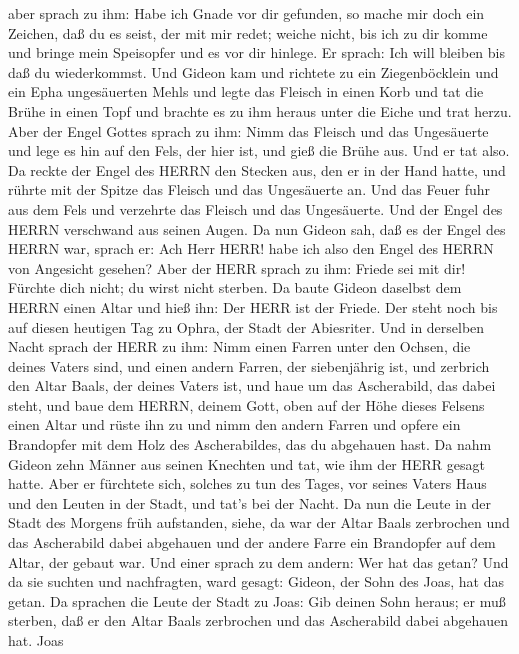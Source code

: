 aber sprach zu ihm: Habe ich Gnade vor dir gefunden, so mache mir doch
ein Zeichen, daß du es seist, der mit mir redet;  weiche
nicht, bis ich zu dir komme und bringe mein Speisopfer und es vor dir
hinlege. Er sprach: Ich will bleiben bis daß du wiederkommst.
 Und Gideon kam und richtete zu ein Ziegenböcklein und ein
Epha ungesäuerten Mehls und legte das Fleisch in einen Korb und tat die
Brühe in einen Topf und brachte es zu ihm heraus unter die Eiche und
trat herzu.  Aber der Engel Gottes sprach zu ihm: Nimm das
Fleisch und das Ungesäuerte und lege es hin auf den Fels, der hier ist,
und gieß die Brühe aus. Und er tat also.  Da reckte der
Engel des HERRN den Stecken aus, den er in der Hand hatte, und rührte
mit der Spitze das Fleisch und das Ungesäuerte an. Und das Feuer fuhr
aus dem Fels und verzehrte das Fleisch und das Ungesäuerte. Und der
Engel des HERRN verschwand aus seinen Augen.  Da nun Gideon
sah, daß es der Engel des HERRN war, sprach er: Ach Herr HERR! habe ich
also den Engel des HERRN von Angesicht gesehen?  Aber der
HERR sprach zu ihm: Friede sei mit dir! Fürchte dich nicht; du wirst
nicht sterben.  Da baute Gideon daselbst dem HERRN einen
Altar und hieß ihn: Der HERR ist der Friede. Der steht noch bis auf
diesen heutigen Tag zu Ophra, der Stadt der Abiesriter. 
Und in derselben Nacht sprach der HERR zu ihm: Nimm einen Farren unter
den Ochsen, die deines Vaters sind, und einen andern Farren, der
siebenjährig ist, und zerbrich den Altar Baals, der deines Vaters ist,
und haue um das Ascherabild, das dabei steht,  und baue dem
HERRN, deinem Gott, oben auf der Höhe dieses Felsens einen Altar und
rüste ihn zu und nimm den andern Farren und opfere ein Brandopfer mit
dem Holz des Ascherabildes, das du abgehauen hast.  Da nahm
Gideon zehn Männer aus seinen Knechten und tat, wie ihm der HERR gesagt
hatte. Aber er fürchtete sich, solches zu tun des Tages, vor seines
Vaters Haus und den Leuten in der Stadt, und tat's bei der Nacht.
 Da nun die Leute in der Stadt des Morgens früh aufstanden,
siehe, da war der Altar Baals zerbrochen und das Ascherabild dabei
abgehauen und der andere Farre ein Brandopfer auf dem Altar, der gebaut
war.  Und einer sprach zu dem andern: Wer hat das getan?
Und da sie suchten und nachfragten, ward gesagt: Gideon, der Sohn des
Joas, hat das getan.  Da sprachen die Leute der Stadt zu
Joas: Gib deinen Sohn heraus; er muß sterben, daß er den Altar Baals
zerbrochen und das Ascherabild dabei abgehauen hat.  Joas
